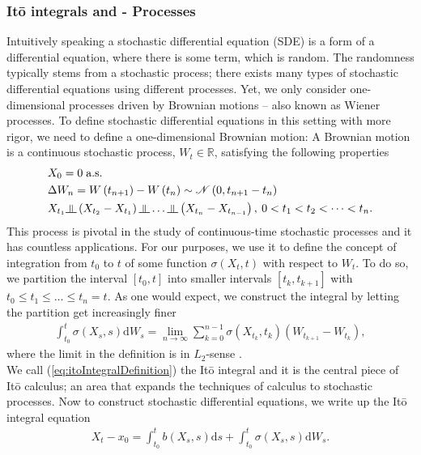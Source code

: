 \subsubsection{Itō integrals and - Processes}
Intuitively speaking a stochastic differential equation (SDE) is a form of a differential equation, where there is some term, which is random. The randomness typically stems from a stochastic process; there exists many types of stochastic differential equations using different processes. Yet, we only consider one-dimensional processes driven by Brownian motions – also known as Wiener processes. To define stochastic differential equations in this setting with more rigor, we need to define a one-dimensional Brownian motion: A Brownian motion is a continuous stochastic process, $W_t\in\mathbb{R}$, satisfying the following properties
\begin{align}
    &X_0 = 0 \; \textrm{a.s.}\label{eq:brownianMotion1}\\
    &\Delta W_n = W\left(t_{n + 1}\right) - W\left(t_{n}\right)\sim\mathcal{N}\left(0, t_{n + 1} - t_{n}\right) \label{eq:brownianMotion2}\\
    &X_{t_1}\indep \left(X_{t_2} - X_{t_1}\right)\indep \dots \indep \left(X_{t_n} - X_{t_{n - 1}}\right), \: 0 < t_1 < t_2 < \dots < t_n. \label{eq:brownianMotion3}
\end{align}
This process is pivotal in the study of continuous-time stochastic processes and it has countless applications. For our purposes, we use it to define the concept of integration from $t_0$ to $t$ of some function $\sigma(X_t, t)$ with respect to $W_t$. To do so, we partition the interval $[t_0, t]$ into smaller intervals $[t_k, t_{k + 1}]$ with $t_0 \leq t_1 \leq \dots \leq t_n = t$. As one would expect, we construct the integral by letting the partition get increasingly finer
\begin{align}
    \int_{t_0}^t \sigma(X_s, s) \mathrm{d}W_s = \lim_{n \to \infty}\sum_{k = 0}^{n - 1} \sigma\left(X_{t_k}, t_k\right)\left(W_{t_{k + 1}} - W_{t_k}\right),\label{eq:itoIntegralDefinition}
\end{align}
where the limit in the definition is in $L_2$-sense \cite[equation 4.6]{Srkk2019}. \\
We call (\ref{eq:itoIntegralDefinition}) the Itō integral and it is the central piece of Itō calculus; an area that expands the techniques of calculus to stochastic processes. Now to construct stochastic differential equations, we write up the Itō integral equation
\begin{align}
    X_t - x_0 = \int_{t_0}^t b(X_s, s)\mathrm{d}s + \int_{t_0}^t \sigma(X_s, s)\mathrm{d}W_s. \label{eq:itoIntegralEquation}
\end{align}
